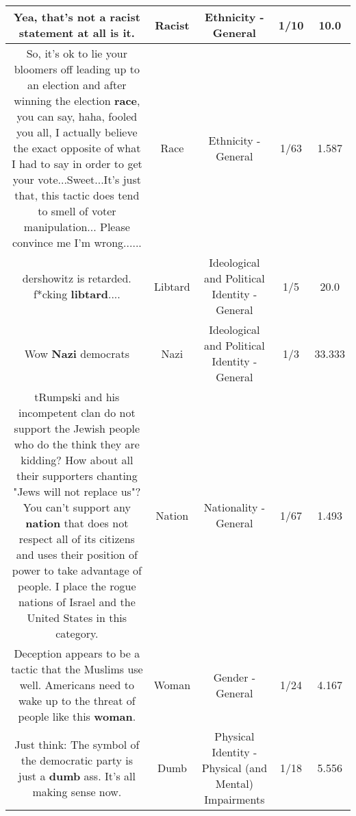 \documentclass[11pt]{article}
\newlength\mylength
\begin{document}
\begin{center}
\begin{longtable}{|C{.65\mylength}|C{.30\mylength}|C{.12\mylength}|C{.12\mylength}|C{.12\mylength}|}
  \small Yea, that's not a \textbf{racist} statement at all is it.\normalsize   & Racist & Ethnicity - General & 1/10 & 10.0 \\  \hline
  \small So, it's ok to lie your bloomers off leading up to an election and after winning the election \textbf{race}, you can say, haha, fooled you all, I actually believe the exact opposite of what I had to say in order to get your vote...Sweet...It's just that, this tactic does tend to smell of voter manipulation...  Please convince me I'm wrong......\normalsize   & Race & Ethnicity - General & 1/63 & 1.587 \\  \hline
  \small dershowitz is retarded.  f*cking \textbf{libtard}....\normalsize   & Libtard &  Ideological and Political Identity - General & 1/5 & 20.0 \\  \hline
  \small Wow \textbf{Nazi} democrats\normalsize   & Nazi &  Ideological and Political Identity - General & 1/3 & 33.333 \\  \hline
  \small tRumpski and his incompetent clan do not support the Jewish people who do the think they are kidding?  How about all their supporters chanting "Jews will not replace us"?  You can't support any \textbf{nation} that does not respect all of its citizens and uses their position of power to take advantage of people.  I place the rogue nations of Israel and the United States in this category.\normalsize   & Nation & Nationality - General & 1/67 & 1.493 \\  \hline
  \small Deception appears to be a tactic that the Muslims use well. Americans need to wake up to the threat of people like this \textbf{woman}.\normalsize   & Woman & Gender - General & 1/24 & 4.167 \\  \hline
  \small Just think: The symbol of the democratic party is just a \textbf{dumb} ass. It's all making sense now.\normalsize   & Dumb & Physical Identity - Physical (and Mental) Impairments & 1/18 & 5.556 \\  \hline

\end{longtable}
\end{center}
\end{document}
